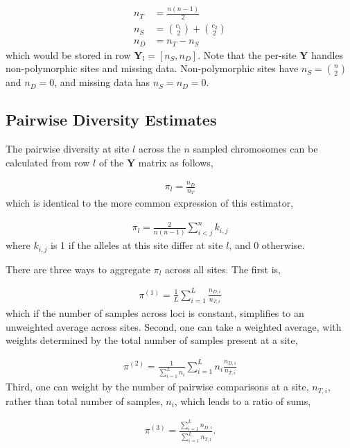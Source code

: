 \documentclass[11pt]{article}
\begin{document}
\begin{align*}
  n_T &= \frac{n(n-1)}{2} \\
  n_S &= {c_1 \choose 2} + {c_2 \choose 2} \\
  n_D &= n_T - n_S
\end{align*}
%
which would be stored in row $\mathbf{Y}_l = [n_S, n_D]$. Note that the
per-site $\mathbf{Y}$ handles non-polymorphic sites and missing data.
Non-polymorphic sites have $n_S = {n \choose 2}$ and $n_D = 0$, and missing
data has $n_S = n_D = 0$.

\subsection{Pairwise Diversity Estimates}
\label{supp:diversity}

The pairwise diversity at site $l$ across the $n$ sampled chromosomes can be
calculated from row $l$ of the $\mathbf{Y}$ matrix as follows,

\begin{align}
  \pi_l = \frac{n_D}{n_T}
\end{align}
%
which is identical to the more common expression of this estimator, 

\begin{align}
  \pi_l = \frac{2}{n(n-1)} \sum_{i < j}^n k_{i,j}
\end{align}
%
where $k_{i,j}$ is 1 if the alleles at this site differ at site $l$, and 0
otherwise.

There are three ways to aggregate $\pi_l$ across all sites. The first is,

\begin{align}
  \pi^{(1)} = \frac{1}{L} \sum_{i=1}^L \frac{n_{D,i}}{n_{T,i}}
\end{align}
%
which if the number of samples across loci is constant, simplifies to an
unweighted average across sites. Second, one can take a weighted average, with
weights determined by the total number of samples present at a site,

\begin{align}
  \pi^{(2)} = \frac{1}{\sum_{i=1}^L n_i} \sum_{i=1}^L n_i \frac{n_{D,i}}{n_{T,i}}
\end{align}
%
Third, one can weight by the number of pairwise comparisons at a site,
$n_{T,i}$, rather than total number of samples, $n_i$, which leads to a ratio
of sums,

\begin{align}
  \pi^{(3)} = \frac{\sum_{i=1}^L n_{D,i}}{\sum_{i=1}^L n_{T,i}}.
\end{align}
\end{document}
